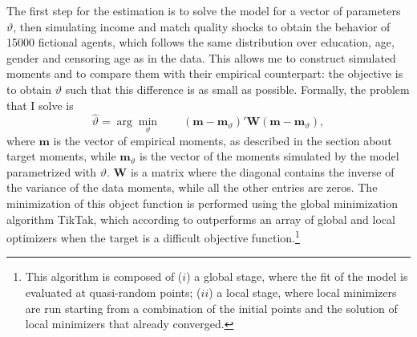 \documentclass[12pt]{article}
\begin{document}
 The first step for the estimation is to solve the model for a vector of parameters $\vartheta$, then simulating income and match quality shocks to obtain the behavior of 15000 fictional agents, which follows the same distribution over education, age, gender and censoring age as in the data. This allows me to construct simulated moments and to compare them with their empirical counterpart: the objective is to obtain $\vartheta$ such that this difference is as small as possible. Formally, the problem that I solve is
 \begin{equation}\label{eq:msm}
 \hat{\vartheta}=\arg\min_\vartheta \quad\quad (\mathbf{m}-\mathbf{m}_\vartheta)'\mathbf{W}(\mathbf{m}-\mathbf{m}_\vartheta),
 \end{equation}
 where $\mathbf{m}$ is the vector of empirical moments, as described in the section about target moments, while $\mathbf{m}_\vartheta$ is the vector of the moments simulated by the model parametrized with $\vartheta$. $\mathbf{W}$ is a matrix where the diagonal contains the inverse of the variance of the data moments, while all the other entries are zeros.  The minimization of this object function is performed using the global minimization algorithm TikTak, which according to \cite{arnoud2019} outperforms an array of global and local optimizers when the target is a difficult objective function.\footnote{This algorithm is composed of ($i$) a global stage, where the fit of the model is evaluated at quasi-random points; ($ii$) a local stage, where local minimizers are run starting from a combination of the initial points and the solution of local minimizers that already converged.}
 
\end{document}
